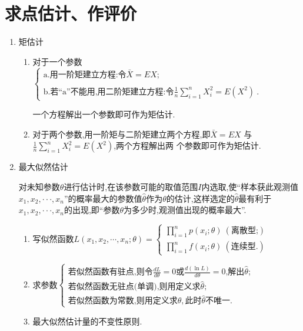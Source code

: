 \section{求点估计、作评价}
\begin{enumerate}
      \item 矩估计
            \begin{enumerate}
                  \item 对于一个参数$\begin{cases}\text{a.用一阶矩建立方程:令}\bar{X}=EX;\\\\\text{b.若“a”不能用,用二阶矩建立方程:令}\frac1n\sum_{i=1}^nX_i^2=E(X^2)\:.\end{cases}$

                        一个方程解出一个参数即可作为矩估计.
                  \item 对于两个参数,用一阶矩与二阶矩建立两个方程,即$\bar{X}=EX$ 与$\frac1n\sum_{i=1}^nX_i^2=E(X^2)$,两个方程解出两
                        个参数即可作为矩估计.
            \end{enumerate}
      \item 最大似然估计

            对未知参数$\theta$进行估计时,在该参数可能的取值范围$I$内选取,使“样本获此观测值$x_1,x_2,\cdotp\cdotp\cdotp,x_n$”的概率最大的参数值$\hat{\theta}$作为$\theta$的估计,这样选定的$\hat{\theta}$最有利于$x_1,x_2,\cdotp\cdotp\cdotp,x_n$的出现,即“参数$\theta$为多少时,观测值出现的概率最大”.
            \begin{enumerate}
                  \item 写似然函数$L(x_{1},x_{2},\cdots,x_{n};\theta)=\left\{\begin{array}{l}{\prod_{i=1}^{n}p(x_{i};\theta)\ (\text{离散型;})}\\{\prod_{i=1}^{n}f(x_{i};\theta)\ (\text{连续型.})}\end{array}\right.$
                  \item 求参数$\left\{\begin{array}{l}\text{若似然函数有驻点,则令}\frac{dL}{d\theta}=0\text{或}\frac{d(\ln L)}{d\theta}=0\text{,解出}\hat{\theta};\\\text{若似然函数无驻点(单调),则用定义求}\hat{\theta};\\\text{若似然函数为常数,则用定义求}\hat{\theta},\text{此时}\hat{\theta}\text{不唯一}.\end{array}\right.$
                  \item 最大似然估计量的不变性原则.


\end{enumerate}
\end{enumerate}
